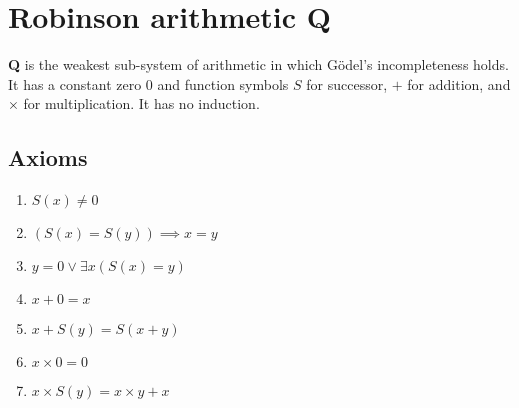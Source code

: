 \documentclass{article}
\begin{document}
\section{Robinson arithmetic Q}
\textbf{Q} is the weakest sub-system of arithmetic in which Gödel's incompleteness holds.
\\ It has a constant zero 0 and function symbols $S$ for successor, $+$ for addition, and $\times$ for multiplication. It has no induction.

\subsection{Axioms}
\begin{enumerate}
	\item $S(x) \neq 0$
	\item $(S(x) = S(y)) \implies x=y$
	\item $y = 0 \lor \exists x (S(x) = y)$
	\item $x + 0 = x$
	\item $x + S(y) = S(x + y)$
	\item $x \times 0 = 0$
	\item $x \times S(y) = x \times y + x$
\end{enumerate}
\end{document}
